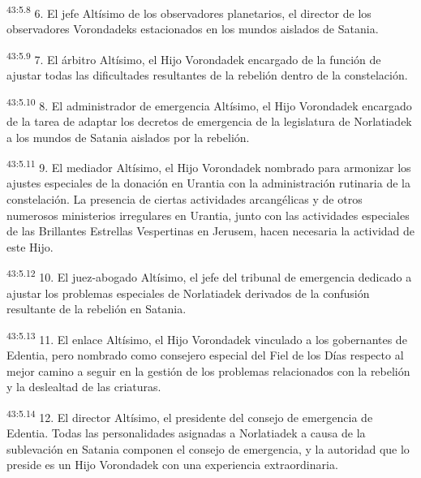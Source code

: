 \par
\textsuperscript{43:5.8} 6. El jefe Altísimo de los observadores planetarios, el director de los observadores Vorondadeks estacionados en los mundos aislados de Satania.

\par
\textsuperscript{43:5.9} 7. El árbitro Altísimo, el Hijo Vorondadek encargado de la función de ajustar todas las dificultades resultantes de la rebelión dentro de la constelación.

\par
\textsuperscript{43:5.10} 8. El administrador de emergencia Altísimo, el Hijo Vorondadek encargado de la tarea de adaptar los decretos de emergencia de la legislatura de Norlatiadek a los mundos de Satania aislados por la rebelión.

\par
\textsuperscript{43:5.11} 9. El mediador Altísimo, el Hijo Vorondadek nombrado para armonizar los ajustes especiales de la donación en Urantia con la administración rutinaria de la constelación. La presencia de ciertas actividades arcangélicas y de otros numerosos ministerios irregulares en Urantia, junto con las actividades especiales de las Brillantes Estrellas Vespertinas en Jerusem, hacen necesaria la actividad de este Hijo.

\par
\textsuperscript{43:5.12} 10. El juez-abogado Altísimo, el jefe del tribunal de emergencia dedicado a ajustar los problemas especiales de Norlatiadek derivados de la confusión resultante de la rebelión en Satania.

\par
\textsuperscript{43:5.13} 11. El enlace Altísimo, el Hijo Vorondadek vinculado a los gobernantes de Edentia, pero nombrado como consejero especial del Fiel de los Días respecto al mejor camino a seguir en la gestión de los problemas relacionados con la rebelión y la deslealtad de las criaturas.

\par
\textsuperscript{43:5.14} 12. El director Altísimo, el presidente del consejo de emergencia de Edentia. Todas las personalidades asignadas a Norlatiadek a causa de la sublevación en Satania componen el consejo de emergencia, y la autoridad que lo preside es un Hijo Vorondadek con una experiencia extraordinaria.

